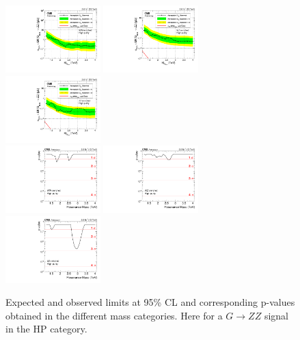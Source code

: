 \begin{figure}[h!]
\centering
\includegraphics[width=0.327\textwidth]{figures/analysis/search1/AN-15-211/limits/brazilianFlag_BulkZZ_WWHP_13TeV_wPDF.pdf}
\includegraphics[width=0.327\textwidth]{figures/analysis/search1/AN-15-211/limits/brazilianFlag_BulkZZ_WZHP_13TeV_wPDF.pdf}
\includegraphics[width=0.327\textwidth]{figures/analysis/search1/AN-15-211/limits/brazilianFlag_BulkZZ_ZZHP_13TeV_wPDF.pdf}\\
\includegraphics[width=0.327\textwidth]{figures/analysis/search1/AN-15-211/pvalues/pvalue_BulkZZinWW_high_purity.pdf}
\includegraphics[width=0.327\textwidth]{figures/analysis/search1/AN-15-211/pvalues/pvalue_BulkZZinWZ_high_purity.pdf}
\includegraphics[width=0.327\textwidth]{figures/analysis/search1/AN-15-211/pvalues/pvalue_BulkZZinZZ_high_purity.pdf}
\caption{Expected and observed limits at 95\% CL and corresponding p-values obtained in the different mass categories. Here for a $G\rightarrow ZZ$ signal in the HP category.}
\label{fig:app:Limits_HPBulkZZ}
\end{figure}
